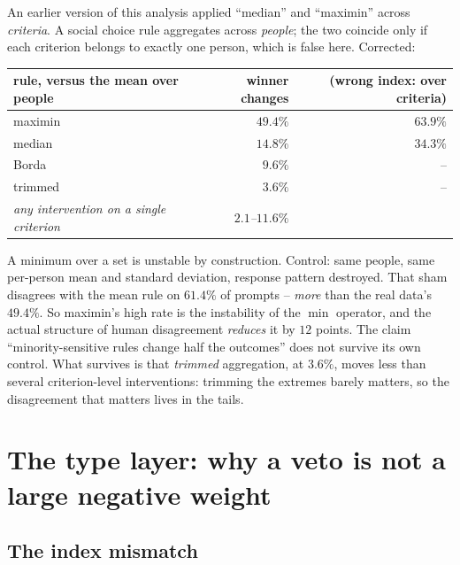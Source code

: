 An earlier version of this analysis applied ``median'' and ``maximin'' across
\emph{criteria}. A social choice rule aggregates across \emph{people}; the two
coincide only if each criterion belongs to exactly one person, which is false
here. Corrected:

\begin{table}[H]\centering\small
\begin{tabular}{lrr}
\toprule
rule, versus the mean over people & winner changes & (wrong index: over criteria)\\
\midrule
maximin & $49.4\%$ & $63.9\%$\\
median & $14.8\%$ & $34.3\%$\\
Borda & $9.6\%$ & --\\
trimmed & $\mathbf{3.6\%}$ & --\\
\midrule
\emph{any intervention on a single criterion} & \emph{$2.1$--$11.6\%$} &\\
\bottomrule
\end{tabular}
\label{tab:aggrule}
\end{table}

\begin{remark}
A minimum over a set is unstable by construction. Control: same people, same
per-person mean and standard deviation, response pattern destroyed. That sham
disagrees with the mean rule on $61.4\%$ of prompts -- \emph{more} than the real
data's $49.4\%$. So maximin's high rate is the instability of the $\min$
operator, and the actual structure of human disagreement \emph{reduces} it by
$12$ points. The claim ``minority-sensitive rules change half the outcomes'' does
not survive its own control. What survives is that \emph{trimmed} aggregation,
at $3.6\%$, moves less than several criterion-level interventions: trimming the
extremes barely matters, so the disagreement that matters lives in the tails.
\end{remark}

\section{The type layer: why a veto is not a large negative weight}
\label{sec:type}

\subsection{The index mismatch}

